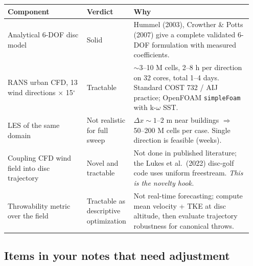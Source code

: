 \documentclass[11pt,letterpaper]{article}
\begin{document}
\begin{center}
\footnotesize
\begin{tabular}{@{}p{0.32\linewidth}p{0.15\linewidth}p{0.48\linewidth}@{}}
\toprule
\textbf{Component} & \textbf{Verdict} & \textbf{Why} \\
\midrule
Analytical 6-DOF disc model & Solid & Hummel (2003), Crowther \& Potts (2007) give a complete validated 6-DOF formulation with measured coefficients. \\
RANS urban CFD, 13 wind directions $\times$ 15$^\circ$ & Tractable & $\sim$3--10 M cells, 2--8 h per direction on 32 cores, total 1--4 days. Standard COST 732 / AIJ practice; OpenFOAM \texttt{simpleFoam} with k-$\omega$ SST. \\
LES of the same domain & Not realistic for full sweep & $\Delta x \sim 1$--$2$ m near buildings $\Rightarrow$ 50--200 M cells per case. Single direction is feasible (weeks). \\
Coupling CFD wind field into disc trajectory & Novel and tractable & Not done in published literature; the Lukes et al.\ (2022) disc-golf code uses uniform freestream. \emph{This is the novelty hook.} \\
Throwability metric over the field & Tractable as descriptive optimization & Not real-time forecasting; compute mean velocity + TKE at disc altitude, then evaluate trajectory robustness for canonical throws. \\
\bottomrule
\end{tabular}
\end{center}

\subsection{Items in your notes that need adjustment}
\end{document}
